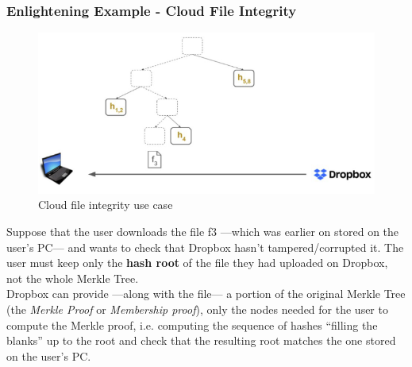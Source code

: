 \subsubsection*{Enlightening Example - Cloud File Integrity}
\begin{figure}[htbp]
   \centering
   \includegraphics{images/merkle_example.png}
   \caption{Cloud file integrity use case}
   \label{fig:merkle_example}
\end{figure}
Suppose that the user downloads the file f3 ---which was earlier on stored on the user's PC--- and wants to check that Dropbox hasn't tampered/corrupted it.
The user must keep only the \textbf{hash root} of the file they had uploaded on Dropbox, not the whole Merkle Tree.\\
Dropbox can provide ---along with the file--- a portion of the original Merkle Tree (the \textit{Merkle Proof} or \textit{Membership proof}), only the nodes needed for the user to compute the Merkle proof, i.e. computing the sequence of hashes ``filling the blanks'' up to the root and check that the resulting root matches the one stored on the user's PC.

